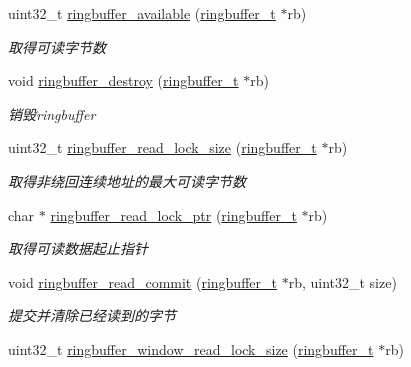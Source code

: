 \begin{DoxyCompactItemize}
uint32\+\_\+t \hyperlink{a00084_a4fca0cda42cddc178da4ab3abd92ae3a_a4fca0cda42cddc178da4ab3abd92ae3a}{ringbuffer\+\_\+available} (\hyperlink{a00051_af929c5cf86b6a0f64dde407dfe60482e_af929c5cf86b6a0f64dde407dfe60482e}{ringbuffer\+\_\+t} $\ast$rb)
\begin{DoxyCompactList}\small\item\em 取得可读字节数 \end{DoxyCompactList}\item 
void \hyperlink{a00084_a968f7b808cc3085482292c1f31d92740_a968f7b808cc3085482292c1f31d92740}{ringbuffer\+\_\+destroy} (\hyperlink{a00051_af929c5cf86b6a0f64dde407dfe60482e_af929c5cf86b6a0f64dde407dfe60482e}{ringbuffer\+\_\+t} $\ast$rb)
\begin{DoxyCompactList}\small\item\em 销毁ringbuffer \end{DoxyCompactList}\item 
uint32\+\_\+t \hyperlink{a00084_a17f80ee6eedc285a3086107f10d0605b_a17f80ee6eedc285a3086107f10d0605b}{ringbuffer\+\_\+read\+\_\+lock\+\_\+size} (\hyperlink{a00051_af929c5cf86b6a0f64dde407dfe60482e_af929c5cf86b6a0f64dde407dfe60482e}{ringbuffer\+\_\+t} $\ast$rb)
\begin{DoxyCompactList}\small\item\em 取得非绕回连续地址的最大可读字节数 \end{DoxyCompactList}\item 
char $\ast$ \hyperlink{a00084_a7611ebce8ddc6637724794195ad6c035_a7611ebce8ddc6637724794195ad6c035}{ringbuffer\+\_\+read\+\_\+lock\+\_\+ptr} (\hyperlink{a00051_af929c5cf86b6a0f64dde407dfe60482e_af929c5cf86b6a0f64dde407dfe60482e}{ringbuffer\+\_\+t} $\ast$rb)
\begin{DoxyCompactList}\small\item\em 取得可读数据起止指针 \end{DoxyCompactList}\item 
void \hyperlink{a00084_aea7ff5a3bd3ede77f076abaefad3fcb1_aea7ff5a3bd3ede77f076abaefad3fcb1}{ringbuffer\+\_\+read\+\_\+commit} (\hyperlink{a00051_af929c5cf86b6a0f64dde407dfe60482e_af929c5cf86b6a0f64dde407dfe60482e}{ringbuffer\+\_\+t} $\ast$rb, uint32\+\_\+t size)
\begin{DoxyCompactList}\small\item\em 提交并清除已经读到的字节 \end{DoxyCompactList}\item 
uint32\+\_\+t \hyperlink{a00084_a0c3a46a4cfef551f1117b178748f718e_a0c3a46a4cfef551f1117b178748f718e}{ringbuffer\+\_\+window\+\_\+read\+\_\+lock\+\_\+size} (\hyperlink{a00051_af929c5cf86b6a0f64dde407dfe60482e_af929c5cf86b6a0f64dde407dfe60482e}{ringbuffer\+\_\+t} $\ast$rb)

\end{DoxyCompactItemize}
